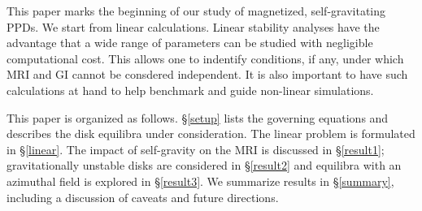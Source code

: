 \documentclass[iop]{emulateapj}
\begin{document}

This paper marks the beginning of our study of magnetized,
self-gravitating PPDs. We start from linear calculations. 
Linear stability analyses have the advantage that a wide range of
parameters can be studied with negligible computational cost. This
allows one to indentify conditions, if any, under which MRI and GI
cannot be consdered independent. It is also important to have such 
calculations at hand to help benchmark and guide non-linear
simulations.   


This paper is organized as follows. \S\ref{setup} lists the governing
equations and describes the disk equilibra under consideration. 
The linear problem is formulated in \S\ref{linear}. The impact
of self-gravity on the MRI is discussed in
\S\ref{result1}; gravitationally unstable disks are considered in
\S\ref{result2} and equilibra with an azimuthal field is explored in
\S\ref{result3}. We summarize results in \S\ref{summary}, including a
discussion of caveats and future directions. 





 


\appendix




\end{document}

